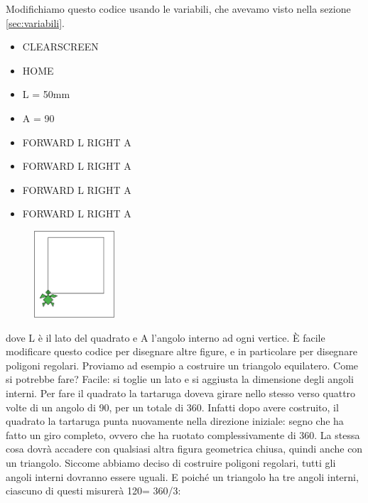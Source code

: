 \vskip 1cm

Modifichiamo questo codice usando le variabili, che avevamo visto nella sezione \ref{sec:variabili}. 

\vskip 1cm

\begin{scriptsize}
\begin{minipage}{0.40\textwidth}
\begin{itemize}[itemsep=-3pt,parsep=2pt]
\item[] CLEARSCREEN                                        
\item[] HOME
\item[] L = 50mm
\item[] A = 90
\item[] FORWARD L RIGHT A
\item[] FORWARD L RIGHT A
\item[] FORWARD L RIGHT A
\item[] FORWARD L RIGHT A                                  
\end{itemize}
\end{minipage}
\end{scriptsize}
\begin{minipage}{0.4\textwidth}
\begin{figure}[H]
   \includegraphics[width=3.0cm,trim=4 4 8 4,clip]{./images/ripetere/ripetere-1.png}
   \label{rip-2-a}
\end{figure}
\end{minipage} \hfill

dove L è il lato del quadrato e A l'angolo interno ad ogni vertice. È facile modificare questo codice per disegnare altre figure, e in particolare per disegnare poligoni regolari. Proviamo ad esempio a costruire un  triangolo equilatero. Come si potrebbe fare? Facile: si toglie un lato e si aggiusta la dimensione degli angoli interni. Per fare il quadrato la tartaruga doveva girare nello stesso verso quattro volte di un angolo di 90\degree, per un totale di 360\degree. Infatti dopo avere costruito, il quadrato la tartaruga punta nuovamente nella direzione iniziale: segno che ha fatto un giro completo, ovvero che ha ruotato complessivamente di 360\degree. La stessa cosa dovrà accadere con qualsiasi altra figura geometrica chiusa, quindi anche con un triangolo. Siccome abbiamo deciso di costruire poligoni regolari, tutti gli angoli interni dovranno essere uguali. E poiché un triangolo ha tre angoli interni, ciascuno di questi misurerà 120\degree = 360\degree/3:

